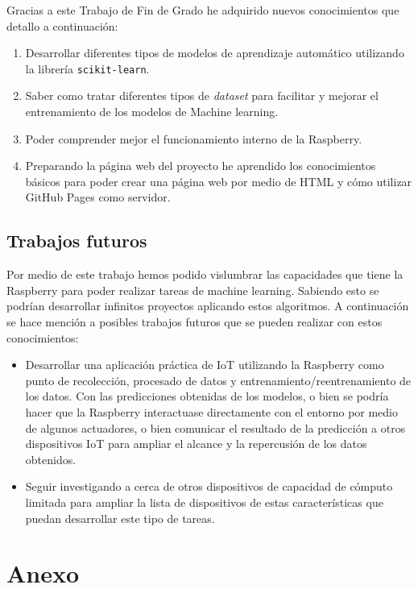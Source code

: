 \documentclass[a4paper, 12pt]{book}
\begin{document}
Gracias a este Trabajo de Fin de Grado he adquirido nuevos conocimientos que detallo a continuación:

\begin{enumerate}
  \item Desarrollar diferentes tipos de modelos de aprendizaje automático utilizando la librería \texttt{scikit-learn}.
  \item Saber como tratar diferentes tipos de \textit{dataset} para facilitar y mejorar el entrenamiento de los modelos de Machine learning.
  \item Poder comprender mejor el funcionamiento interno de la Raspberry.
  \item Preparando la página web del proyecto he aprendido los conocimientos básicos para poder crear una página web por medio de HTML y cómo utilizar GitHub Pages como servidor.
\end{enumerate} 


\section{Trabajos futuros}
\label{sec:trabajos_futuros}

Por medio de este trabajo hemos podido vislumbrar las capacidades que tiene la Raspberry para poder realizar tareas de machine learning. Sabiendo esto se podrían desarrollar infinitos proyectos aplicando estos algoritmos. A continuación se hace mención a posibles trabajos futuros que se pueden realizar con estos conocimientos:

\begin{itemize}
    \item Desarrollar una aplicación práctica de IoT utilizando la Raspberry como punto de recolección, procesado de datos y entrenamiento/reentrenamiento de los datos. Con las predicciones obtenidas de los modelos, o bien se podría hacer que la Raspberry interactuase directamente con el entorno por medio de algunos actuadores, o bien comunicar el resultado de la predicción a otros dispositivos IoT para ampliar el alcance y la repercusión de los datos obtenidos.
    
    \item Seguir investigando a cerca de otros dispositivos de capacidad de cómputo limitada para ampliar la lista de dispositivos de estas características que puedan desarrollar este tipo de tareas.
\end{itemize}

\chapter{Anexo}
\label{chap:anexo}
\end{document}
